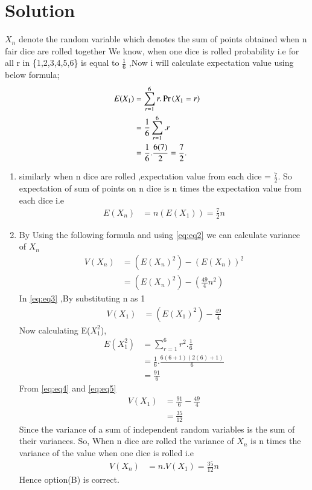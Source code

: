 \documentclass[journal,12pt,twocolumn]{IEEEtran}
\begin{document}
\section{Solution}
$X_{n}$ denote the random variable which denotes the sum of points obtained when n fair dice are rolled together
We know, when one dice is rolled probability i.e  for all r in \{1,2,3,4,5,6\} is equal to  $\frac{1}{6}$ ,Now i will calculate expectation value
using below formula;
\begin{align}
 E( X_{1})&=  \sum_{r=1}^6 r.\Pr\left(X_{1}=r\right)
 \label{eq:eq1}
\\
&=\frac{1}{6}\sum_{r=1}^6 .r
\\
&=\frac{1}{6}.\frac{6(7)}{2} =\frac{7}{2}.
\end{align}
\begin{enumerate}
\item similarly when n dice are rolled ,expectation value from each dice 
= $\frac{7}{2} $. 
So expectation of sum of points on n dice is n times the expectation value from each dice i.e
\begin{align}
    E(X_{n})& = n(E(X_{1})) =\frac{7}{2} n 
\label{eq:eq2}
\end{align}
\newpage
    \item By Using the following formula and using \eqref{eq:eq2}  we can calculate variance of  $X_{n}$ 
    \begin{align}
    V(X_{n})&=(E(X_{n})^{2}) - (E(X_{n}))^{2}
    \\
    &=(E(X_{n})^{2}) - (\frac{49}{4}n^{2})
    \label{eq:eq3}
    \end{align}
    In \eqref{eq:eq3} ,By substituting n as 1 
    \begin{align}
        V(X_{1})&=(E(X_{1})^{2}) - \frac{49}{4}
        \label{eq:eq4}
    \end{align}
    Now calculating E($X_{1}^{2}$),
    \begin{align}
      E(X_{1}^{2})&=\sum_{r=1}^6r^{2}.\frac{1}{6}
      \\
      &=\frac{1}{6}.\frac{6(6+1)(2(6)+1)}{6}
      \\
      &=\frac{91}{6}
      \label{eq:eq5}
    \end{align}
    From \eqref{eq:eq4} and \eqref{eq:eq5}
    \begin{align}
        V(X_{1})&=\frac{91}{6} -\frac{49}{4}
        \\
        &=\frac{35}{12}
        \label{eq:eq6}
    \end{align}
    Since the variance of a sum of independent random variables is the sum of their variances. So, When n dice are rolled the variance of $X_{n}$ is n times the variance of the value when one dice is rolled i.e
    \begin{align}
        V(X_{n})&=n.V(X_{1}) = \frac{35}{12}n
    \end{align}
    Hence option(B) is correct.
\end{enumerate}
\end{document}
